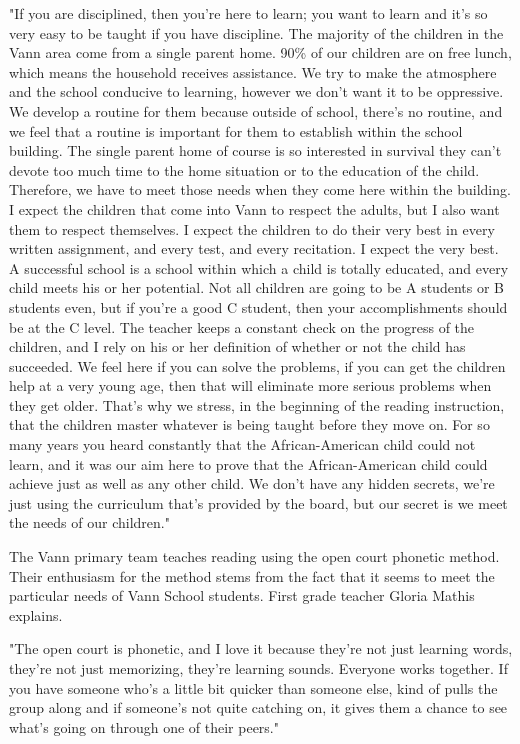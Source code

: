 "If you are disciplined, then you're here to learn; you want to learn and it's so very easy to be taught if you have discipline. The majority of the children in the Vann area come from a single parent home. 90\% of our children are on free lunch, which means the household receives assistance. We try to make the atmosphere and the school conducive to learning, however we don't want it to be oppressive. We develop a routine for them because outside of school, there's no routine, and we feel that a routine is important for them to establish within the school building. The single parent home of course is so interested in survival they can't devote too much time to the home situation or to the education of the child. Therefore, we have to meet those needs when they come here within the building. I expect the children that come into Vann to respect the adults, but I also want them to respect themselves. I expect the children to do their very best in every written assignment, and every test, and every recitation. I expect the very best. A successful school is a school within which a child is totally educated, and every child meets his or her potential. Not all children are going to be A students or B students even, but if you're a good C student, then your accomplishments should be at the C level. The teacher keeps a constant check on the progress of the children, and I rely on his or her definition of whether or not the child has succeeded. We feel here if you can solve the problems, if you can get the children help at a very young age, then that will eliminate more serious problems when they get older. That's why we stress, in the beginning of the reading instruction, that the children master whatever is being taught before they move on. For so many years you heard constantly that the African-American child could not learn, and it was our aim here to prove that the African-American child could achieve just as well as any other child. We don't have any hidden secrets, we're just using the curriculum that's provided by the board, but our secret is we meet the needs of our children."

The Vann primary team teaches reading using the open court phonetic method. Their enthusiasm for the method stems from the fact that it seems to meet the particular needs of Vann School students. First grade teacher Gloria Mathis explains.

"The open court is phonetic, and I love it because they're not just learning words, they're not just memorizing, they're learning sounds. Everyone works together. If you have someone who's a little bit quicker than someone else, kind of pulls the group along and if someone's not quite catching on, it gives them a chance to see what's going on through one of their peers."


